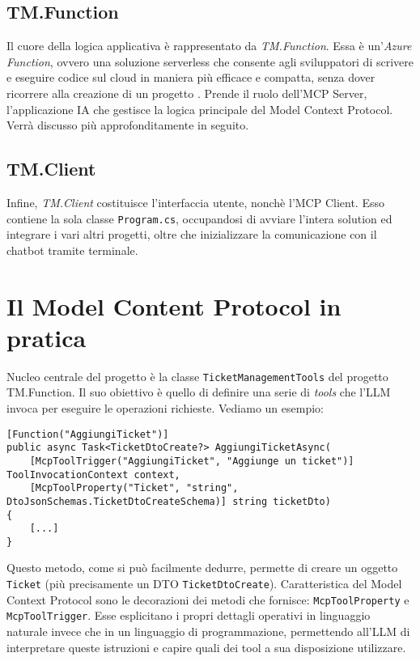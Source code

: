 \subsection{TM.Function}
Il cuore della logica applicativa è rappresentato da \textit{TM.Function}. Essa è un'\textit{Azure Function}, ovvero una soluzione serverless
che consente agli sviluppatori di scrivere e eseguire codice sul cloud in maniera più efficace e compatta, senza dover ricorrere alla
creazione di un progetto \cite{azurefunctions_msdocs}. Prende il ruolo dell'MCP Server, l'applicazione IA che gestisce la logica principale del
Model Context Protocol. Verrà discusso più approfonditamente in seguito.

\subsection{TM.Client}
Infine, \textit{TM.Client} costituisce l'interfaccia utente, nonchè l'MCP Client. Esso contiene la sola classe \texttt{Program.cs}, occupandosi
di avviare l'intera solution ed integrare i vari altri progetti, oltre che inizializzare la comunicazione con il chatbot tramite terminale.

\newpage
\section{Il Model Content Protocol in pratica}
Nucleo centrale del progetto è la classe \texttt{TicketManagementTools} del progetto TM.Function. Il suo obiettivo è quello di definire una serie
di \textit{tools} che l'LLM invoca per eseguire le operazioni richieste. Vediamo un esempio:

\begin{scriptsize}
\begin{verbatim}
[Function("AggiungiTicket")]
public async Task<TicketDtoCreate?> AggiungiTicketAsync(
    [McpToolTrigger("AggiungiTicket", "Aggiunge un ticket")] ToolInvocationContext context,
    [McpToolProperty("Ticket", "string", DtoJsonSchemas.TicketDtoCreateSchema)] string ticketDto)
{
    [...]
}
\end{verbatim}
\end{scriptsize}

Questo metodo, come si può facilmente dedurre, permette di creare un oggetto \texttt{Ticket} (più precisamente un DTO \texttt{TicketDtoCreate}).
Caratteristica del Model Context Protocol sono le decorazioni dei metodi che fornisce: \texttt{McpToolProperty} e \texttt{McpToolTrigger}. Esse esplicitano i propri
dettagli operativi in linguaggio naturale invece che in un linguaggio di programmazione, permettendo all'LLM di interpretare queste istruzioni
e capire quali dei tool a sua disposizione utilizzare.

